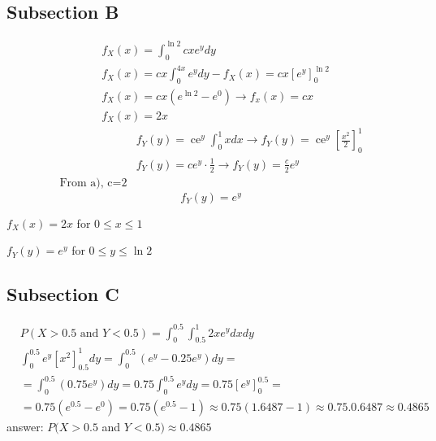 \documentclass[a4paper,11pt]{article}
\theoremstyle{mytheor}
\begin{document}
\subsection{Subsection B}
$$
\begin{aligned}
& f_X(x)=\int_0^{\ln 2} c x e^y d y \\
& f_X(x)=c x \int_0^{4 x} e^y d y-f_X(x)=c x\left[e^y\right]_0^{\ln 2} \\
& f_X(x)=c x\left(e^{\ln 2}-e^0\right) \rightarrow f_x(x)=c x \\
& f_X(x)=2 x
\end{aligned}
$$
$$
\begin{aligned}
& f_Y(y)=\operatorname{ce}^y \int_0^1 x d x \rightarrow f_Y(y)=\operatorname{ce}^y\left[\frac{x^2}{2}\right]_0^1 \\
& f_Y(y)={ce}^y \cdot \frac{1}{2} \rightarrow f_Y(y)=\frac{c}{2} e^y\\
\text{From a), c=2}
\end{aligned}
$$
$$
f_Y(y)=e^y
$$

$f_X(x)=2 x$ for $0 \leqslant x \leqslant 1$

$f_Y(y)=e^y$ for $0 \leqslant y \leqslant \ln 2$

\newpage
\subsection{Subsection C}

$$
\begin{aligned}
& P(X>0.5 \text { and } Y<0.5)=\int_0^{0.5} \int_{0.5}^1 2 x e^y d x d y \\
& \int_0^{0.5} e^y\left[x^2\right]_{0.5}^1 d y=\int_0^{0.5}\left(e^y-0.25 e^y\right) d y= \\
& =\int_0^{0.5}\left(0.75 e^y\right) d y=0.75 \int_0^{0.5} e^y d y=0.75\left[e^y\right]_0^{0.5}= \\
& =0.75\left(e^{0.5}-e^0\right)=0.75\left(e^{0.5}-1\right) \approx 0.75(1.6487-1) \approx 0.75 .0 .6487 \approx 0.4865
\end{aligned}
$$
answer: $P(X>0.5$ and $Y<0.5) \approx 0.4865$
\end{document}

